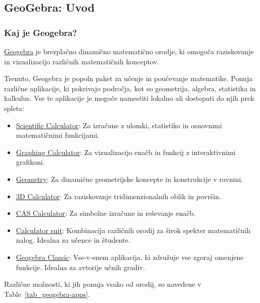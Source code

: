 \subsection{GeoGebra: Uvod}

\subsubsection{Kaj je Geogebra?}

\href{https://www.geogebra.org/}{Geogebra} je brezplačno dinamično matematično orodje, ki omogoča raziskovanje in vizualizacijo različnih matematičnih konceptov.

Trenuto, Geogebra je popoln paket za učenje in poučevanje matematike. Ponuja različne aplikacije, ki pokrivajo področja, kot so geometrija, algebra, statistika in kalkulus.
Vse te aplikacije je mogoče namestiti lokalno ali dostopati do njih prek spleta:

\begin{itemize}
\item \href{https://www.geogebra.org/scientific}{Scientific Calculator}: Za izračune z ulomki, statistiko in osnovnimi matematičnimi funkcijami.
\item \href{https://www.geogebra.org/graphing}{Graphing Calculator}: Za vizualizacijo enačb in funkcij z interaktivnimi grafikoni.
\item \href{https://www.geogebra.org/geometry}{Geometry}: Za dinamične geometrijske koncepte in konstrukcije v ravnini.
\item \href{https://www.geogebra.org/3d}{3D Calculator}: Za raziskovanje tridimenzionalnih oblik in površin.
\item \href{https://www.geogebra.org/cas}{CAS Calculator}: Za simbolne izračune in reševanje enačb.
\item \href{https://www.geogebra.org/calculator}{Calculator suit}: Kombinacija različnih orodij za širok spekter matematičnih nalog. Idealna za učence in študente.
\item \href{https://www.geogebra.org/classic}{Geogebra Classic}: Vse-v-enem aplikacija, ki združuje vse zgoraj omenjene funkcije. Idealna za avtorije učnih gradiv.
\end{itemize}

Različne možnosti, ki jih ponuja vsako od orodij, so navedene v Table~\ref{tab_geogebra-apps}.

